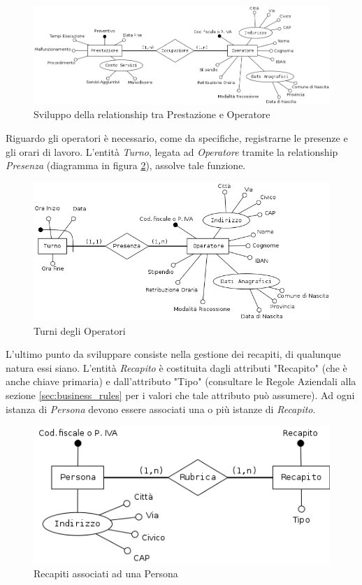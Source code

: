 			\begin{figure}
				\centering
				\includegraphics[width=11.5cm]{images/finitures/operatore_prestazione.png}
				\caption{Sviluppo della relationship tra Prestazione e Operatore}
				\label{fig:operatore_prestazione}
			\end{figure}
			
			Riguardo gli operatori è necessario, come da specifiche, registrarne le presenze e gli orari di lavoro. L'entità \emph{Turno}, legata ad \emph{Operatore} tramite la relationship \emph{Presenza} (diagramma in figura \ref{fig:operatore_turno}), assolve tale funzione.
			
			\begin{figure}
				\centering
				\includegraphics[width=11.5cm]{images/finitures/operatore_turno.png}
				\caption{Turni degli Operatori}
				\label{fig:operatore_turno}
			\end{figure}
			
			L'ultimo punto da sviluppare consiste nella gestione dei recapiti, di qualunque natura essi siano. L'entità \emph{Recapito} è costituita dagli attributi "Recapito" (che è anche chiave primaria) e dall'attributo "Tipo" (consultare le Regole Aziendali alla sezione \ref{sec:business_rules} per i valori che tale attributo può assumere).
			Ad ogni istanza di \emph{Persona} devono essere associati una o più istanze di \emph{Recapito}.
			
			\begin{figure}[H]
				\centering
				\includegraphics[width=11.5cm]{images/finitures/persona_rubrica.png}
				\caption{Recapiti associati ad una Persona}
				\label{fig:persona_recapito}
			\end{figure}
	
